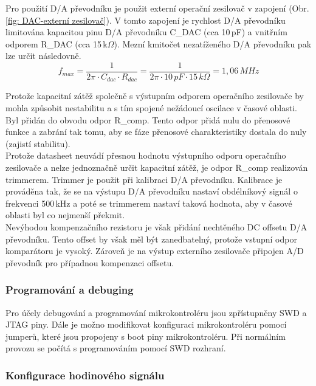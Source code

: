     Pro použití D/A převodníku je použit externí operační zesilovač v zapojení (Obr. \ref{fig: DAC-externí zesilovač}).
    V tomto zapojení je rychlost D/A převodníku limitována kapacitou pinu D/A převodníku C\_DAC (cca 10\,pF)
    a vnitřním odporem R\_DAC (cca 15\,k$\Omega$). Mezní kmitočet nezatíženého D/A převodníku pak lze určit následovně.
    \begin{equation}
        f_{max} = \frac{1}{2\pi \cdot  C_{dac} \cdot  R_{dac}} = \frac{1}{2\pi \cdot 10\,pF \cdot 15\,k\Omega} = 1,06\,MHz
    \end{equation}

    Protože kapacitní zátěž společně s výstupním odporem operačního zesilovače by mohla
    způsobit nestabilitu a s tím spojené nežádoucí oscilace v časové oblasti.
    Byl přidán do obvodu odpor R\_comp. Tento odpor přidá nulu do přenosové funkce a zabrání tak
    tomu, aby se fáze přenosové charakteristiky dostala do nuly (zajistí stabilitu).\\
    
    Protože datasheet neuvádí přesnou hodnotu výstupního odporu operačního zesilovače a nelze jednoznačně
    určit kapacitní zátěž, je odpor R\_comp realizován trimmerem. Trimmer je použit při kalibraci
    D/A převodníku. Kalibrace je prováděna tak, že se na výstupu D/A převodníku nastaví obdélníkový
    signál o frekvenci 500\,kHz a poté se trimmerem nastaví taková hodnota, aby v časové oblasti
    byl co nejmenší překmit\cite{DAC_stability,OPA_stability}.\\

    Nevýhodou kompenzačního rezistoru je však přidání nechtěného DC offsetu D/A převodníku. Tento offset by
    však měl být zanedbatelný, protože vstupní odpor komparátoru je vysoký. Zároveň je na výstup externího zesilovače
    připojen A/D převodník pro případnou kompenzaci offsetu.

    \subsubsection{Programování a debuging}
    Pro účely debugování a programování mikrokontroléru jsou zpřístupněny SWD a JTAG piny.
    Dále je možno modifikovat konfiguraci mikrokontroléru pomocí jumperů, které jsou propojeny
    s boot piny mikrokontroléru. Při normálním provozu se počítá s programováním pomocí SWD rozhraní.

    \subsubsection{Konfigurace hodinového signálu}
    
